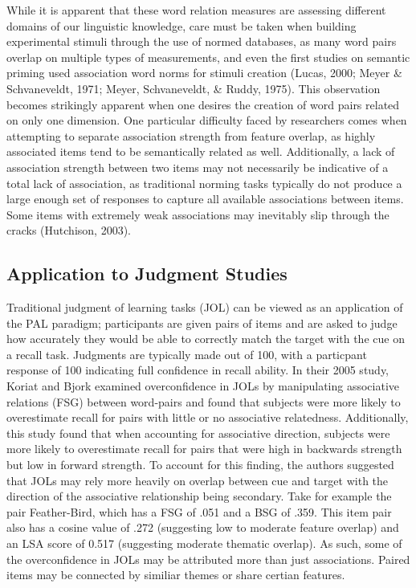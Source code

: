 \documentclass[english,man]{apa6}
\newcounter{author}
\theoremstyle{definition}
\theoremstyle{definition}
\theoremstyle{remark}
\begin{document}
While it is apparent that these word relation measures are assessing
different domains of our linguistic knowledge, care must be taken when
building experimental stimuli through the use of normed databases, as
many word pairs overlap on multiple types of measurements, and even the
first studies on semantic priming used association word norms for
stimuli creation (Lucas, 2000; Meyer \& Schvaneveldt, 1971; Meyer,
Schvaneveldt, \& Ruddy, 1975). This observation becomes strikingly
apparent when one desires the creation of word pairs related on only one
dimension. One particular difficulty faced by researchers comes when
attempting to separate association strength from feature overlap, as
highly associated items tend to be semantically related as well.
Additionally, a lack of association strength between two items may not
necessarily be indicative of a total lack of association, as traditional
norming tasks typically do not produce a large enough set of responses
to capture all available associations between items. Some items with
extremely weak associations may inevitably slip through the cracks
(Hutchison, 2003).

\subsection{Application to Judgment
Studies}\label{application-to-judgment-studies}

Traditional judgment of learning tasks (JOL) can be viewed as an
application of the PAL paradigm; participants are given pairs of items
and are asked to judge how accurately they would be able to correctly
match the target with the cue on a recall task. Judgments are typically
made out of 100, with a particpant response of 100 indicating full
confidence in recall ability. In their 2005 study, Koriat and Bjork
examined overconfidence in JOLs by manipulating associative relations
(FSG) between word-pairs and found that subjects were more likely to
overestimate recall for pairs with little or no associative relatedness.
Additionally, this study found that when accounting for associative
direction, subjects were more likely to overestimate recall for pairs
that were high in backwards strength but low in forward strength. To
account for this finding, the authors suggested that JOLs may rely more
heavily on overlap between cue and target with the direction of the
associative relationship being secondary. Take for example the pair
Feather-Bird, which has a FSG of .051 and a BSG of .359. This item pair
also has a cosine value of .272 (suggesting low to moderate feature
overlap) and an LSA score of 0.517 (suggesting moderate thematic
overlap). As such, some of the overconfidence in JOLs may be attributed
more than just associations. Paired items may be connected by similiar
themes or share certian features.
\end{document}
